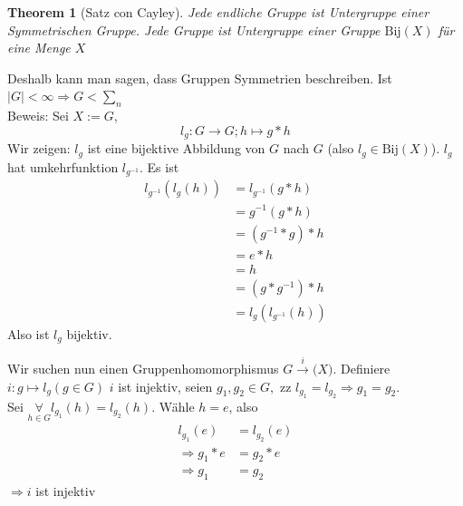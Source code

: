 \documentclass{article}
\newtheorem{thm}{Theorem}[section]
\newcommand{\bij}{\text{Bij}}
\begin{document}
\color{black}
\begin{thm}[Satz con Cayley]
    Jede endliche Gruppe ist Untergruppe einer Symmetrischen
    Gruppe. Jede Gruppe ist Untergruppe einer Gruppe
    $\bij(X)$ für eine Menge $X$
\end{thm}
\color{blue}
Deshalb kann man sagen, dass Gruppen Symmetrien beschreiben.
Ist $|G|<\infty\Rightarrow G<\sum_{n}$\\
\color{black}
Beweis:
Sei $X:=G$,
\begin{equation*}
    l_g:G\to G;h\mapsto g*h
\end{equation*}
Wir zeigen: $l_g$ ist eine bijektive Abbildung von $G$
nach $G$ (also $l_g\in\bij(X)$).
$l_g$ hat umkehrfunktion $l_{g^{-1}}$. Es ist
\begin{align*}
    l_{g^{-1}}(l_g(h))&=
    l_{g^{-1}}(g*h)\\
    &=g^{-1}(g*h)\\
    &=(g^{-1}*g)*h\\
    &=e*h\\
    &=h\\
    &=(g*g^{-1})*h\\
    &=l_g(l_{g^{-1}}(h))
\end{align*}
Also ist $l_g$ bijektiv.

Wir suchen nun einen Gruppenhomomorphismus $G\overset{i}\to
\big(X)$. Definiere $i:g\mapsto l_g(g\in G)$
$i$ ist injektiv, seien $g_1,g_2\in G,$ zz $l_{g_1}=l_{g_2}
\Rightarrow g_1=g_2$.\\
Sei $\underset{h\in G}\forall l_{g_1}(h)=l_{g_2}(h)$.
Wähle $h=e$, also
\begin{align*}
    l_{g_1}(e)&=l_{g_2}(e)\\
    \Rightarrow g_1*e&=g_2*e\\
    \Rightarrow g_1&=g_2
\end{align*}
$\Rightarrow i$ ist injektiv
\end{document}
